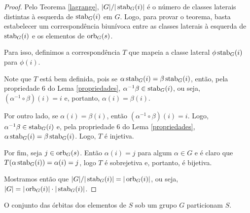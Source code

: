 	\begin{proof}
		Pelo Teorema \eqref{lagrange}, $|G|/|\operatorname{stab}_G(i)|$ é o número de classes laterais distintas à esquerda de $\operatorname{stab}_G(i)$ em $G$. Logo, para provar o teorema, basta estabelecer um correspondência biunívoca entre as classes laterais à esquerda de $\operatorname{stab}_G(i)$ e os elementos de $\operatorname{orb}_G(s)$. 
		\par\vspace{0.3cm} Para isso, definimos a correspondência $T$ que mapeia a classe lateral $\phi\operatorname{stab}_G(i)$ para $\phi(i)$. 
		\par\vspace{0.3cm} Note que $T$ está bem definida, pois se $\alpha\operatorname{stab}_G(i) = \beta\operatorname{stab}_G(i)$, então, pela propriedade 6 do Lema \eqref{propriedades}, $\alpha^{-1}\beta\in\operatorname{stab}_G(i)$, ou seja, $(\alpha^{-1}\circ\beta)(i) = i$ e, portanto, $\alpha(i) = \beta(i)$.
		\par\vspace{0.3cm} Por outro lado, se $\alpha(i) = \beta(i)$, então $(\alpha^{-1}\circ\beta)(i) = i$. Logo, $\alpha^{-1}\beta\in\operatorname{stab}_G(i)$ e, pela propriedade 6 do Lema \eqref{propriedades}, $\alpha\operatorname{stab}_G(i) = \beta\operatorname{stab}_G(i)$. Logo, $T$ é injetiva. 
		\par\vspace{0.3cm} Por fim, seja $j\in\operatorname{orb}_G(s)$. Então $\alpha(i) = j$ para algum $\alpha \in G$ e é claro que $T(\alpha\operatorname{stab}_G(i)) = \alpha(i) = j$, logo $T$ é sobrejetiva e, portanto, é bijetiva.
		\par\vspace{0.3cm} Mostramos então que $|G|/|\operatorname{stab}_G(i)| = |\operatorname{orb}_G(i)|$, ou seja, $|G| = |\operatorname{orb}_G(i)|\cdot|\operatorname{stab}_G(i)|$. 
		
	\end{proof}
	
	\begin{theorem}
		\label{part}
		O conjunto das órbitas dos elementos de $S$ sob um grupo $G$ particionam $S$.
	\end{theorem}
	
